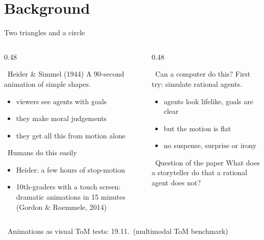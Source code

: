 \documentclass[aspectratio=169,10pt]{beamer}
\newcommand{\seminar}[1]{{\scriptsize\color{gray}\faLink\ #1}}
\newcommand{\tightitem}{\itemsep0.3em}
\begin{document}
\section{Background}

\begin{frame}{Two triangles and a circle}
\begin{columns}[T,onlytextwidth]

\begin{column}{0.48\textwidth}
\begin{block}{\faFilm\ Heider \& Simmel (1944)}
A 90-second animation of simple shapes.
\begin{itemize}\tightitem
  \item viewers see \alert{agents with goals}
  \item they make moral judgements
  \item they get all this from motion alone
\end{itemize}
\end{block}
\begin{block}{\faUsers\ Humans do this easily}
\begin{itemize}\tightitem
  \item Heider: a few hours of stop-motion
  \item 10th-graders with a touch screen: dramatic animations in 15 minutes (Gordon \& Roemmele, 2014)
\end{itemize}
\end{block}
\end{column}

\begin{column}{0.48\textwidth}
\begin{block}{\faRobot\ Can a computer do this?}
First try: simulate rational agents.
\begin{itemize}\tightitem
  \item agents look lifelike, goals are clear
  \item but the motion is flat
  \item no suspense, surprise or irony
\end{itemize}
\end{block}
\begin{block}{\faLightbulb\ Question of the paper}
What does a storyteller do that a rational agent does not?
\end{block}
\end{column}

\end{columns}
\seminar{Animations as visual ToM tests: 19.11.\ (multimodal ToM benchmark)}
\end{frame}
\end{document}
